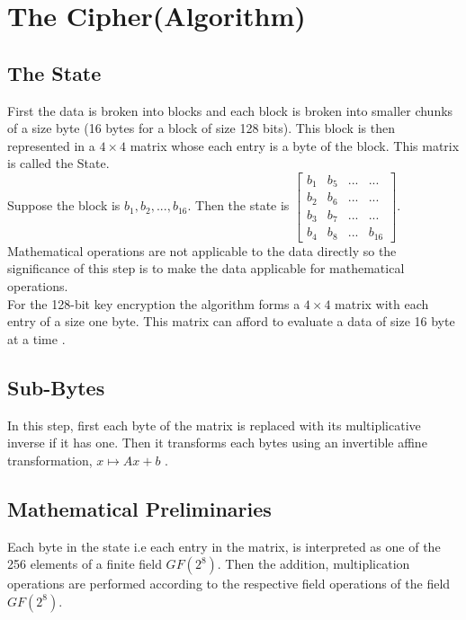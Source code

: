 \vspace{7mm}
\section{The Cipher(Algorithm)}
\subsection{The State}
First the data is broken into blocks and each block is broken into smaller chunks of a size byte (16 bytes for a block of size 128 bits). This block is then represented in a \(4 \times 4\) matrix whose each entry is a byte of the block. This matrix is called the State.\\
  Suppose the block is \(b_1, b_2,...,b_{16}\). Then the state is
    \(\left[\begin{smallmatrix}
  b_1 & b_5 &... & ...\\
  b_2 & b_6 &... & ...\\
  b_3 & b_7 &... & ...\\
  b_4 & b_8 &... & b_{16}
\end{smallmatrix}\right]\).\\[2mm]

Mathematical operations are not applicable to the data directly so the significance of this step is to make the data applicable for mathematical operations.\\
For the 128-bit key encryption the algorithm forms a \(4 \times 4\) matrix with each entry of a size one byte. This matrix can afford to evaluate a data of size 16 byte at a time \cite{aes}.

\vspace{3mm}
\subsection{Sub-Bytes}
In this step, first each byte of the matrix is replaced with its multiplicative inverse if it has one. Then it transforms each bytes using an invertible affine transformation, \(x \mapsto Ax+b\) \cite{aes}.

\subsection{ Mathematical Preliminaries}
Each byte in the state i.e each entry in the matrix, is interpreted as one of the 256 elements of a finite field \(GF(2^8)\). Then the addition, multiplication operations are performed according to the respective field operations of the field \(GF(2^8)\).

